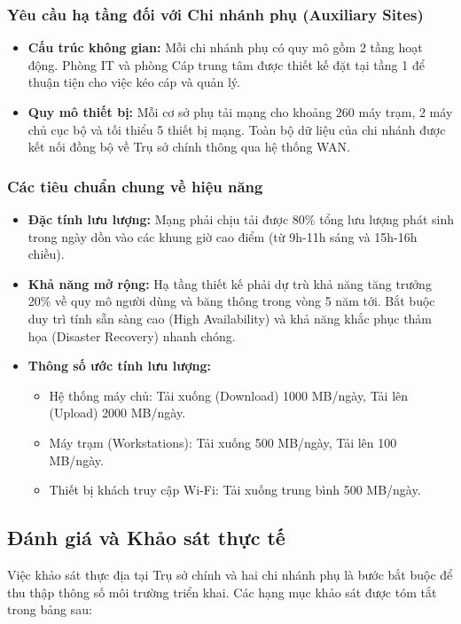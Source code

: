 \subsubsection{Yêu cầu hạ tầng đối với Chi nhánh phụ (Auxiliary Sites)}
\begin{itemize}
    \item \textbf{Cấu trúc không gian:} Mỗi chi nhánh phụ có quy mô gồm 2 tầng hoạt động. Phòng IT và phòng Cáp trung tâm được thiết kế đặt tại tầng 1 để thuận tiện cho việc kéo cáp và quản lý.
    \item \textbf{Quy mô thiết bị:} Mỗi cơ sở phụ tải mạng cho khoảng 260 máy trạm, 2 máy chủ cục bộ và tối thiểu 5 thiết bị mạng. Toàn bộ dữ liệu của chi nhánh được kết nối đồng bộ về Trụ sở chính thông qua hệ thống WAN.
\end{itemize}

\subsubsection{Các tiêu chuẩn chung về hiệu năng}
\begin{itemize}
    \item \textbf{Đặc tính lưu lượng:} Mạng phải chịu tải được 80\% tổng lưu lượng phát sinh trong ngày dồn vào các khung giờ cao điểm (từ 9h-11h sáng và 15h-16h chiều).
    \item \textbf{Khả năng mở rộng:} Hạ tầng thiết kế phải dự trù khả năng tăng trưởng 20\% về quy mô người dùng và băng thông trong vòng 5 năm tới. Bắt buộc duy trì tính sẵn sàng cao (High Availability) và khả năng khắc phục thảm họa (Disaster Recovery) nhanh chóng.
    \item \textbf{Thông số ước tính lưu lượng:} 
    \begin{itemize}
        \item Hệ thống máy chủ: Tải xuống (Download) 1000 MB/ngày, Tải lên (Upload) 2000 MB/ngày.
        \item Máy trạm (Workstations): Tải xuống 500 MB/ngày, Tải lên 100 MB/ngày.
        \item Thiết bị khách truy cập Wi-Fi: Tải xuống trung bình 500 MB/ngày.
    \end{itemize}
\end{itemize}

\subsection{Đánh giá và Khảo sát thực tế}
Việc khảo sát thực địa tại Trụ sở chính và hai chi nhánh phụ là bước bắt buộc để thu thập thông số môi trường triển khai. Các hạng mục khảo sát được tóm tắt trong bảng sau:


